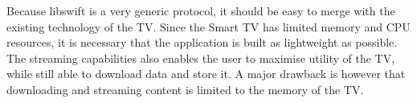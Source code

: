 Because libswift is a very generic protocol, it should be easy to merge with the existing technology of the TV.
Since the Smart TV has limited memory and CPU resources, 
it is necessary that the application is built as lightweight as possible.
The streaming capabilities also enables the user to maximise utility of the TV,
while still able to download data and store it.
A major drawback is however that downloading and streaming content is limited to the memory of the TV.
